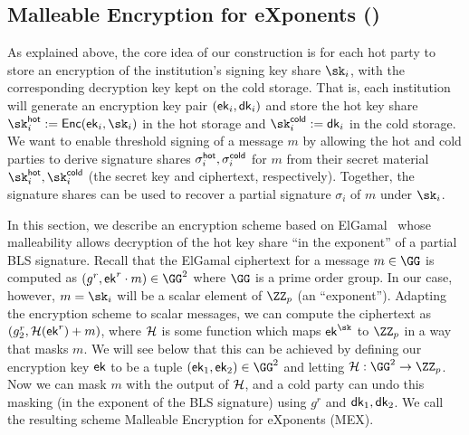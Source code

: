 \subsection{Malleable Encryption for eXponents (\mex)}\label{sec:mex}

As explained above, the core idea of our construction is for each hot party to store an encryption of the institution's signing key share $\sk_i$, with the corresponding decryption key kept on the cold storage.
That is, each institution will generate an encryption key pair $(\mathsf{ek}_i, \mathsf{dk}_i)$ and store the hot key share $\sk_i^\hot := \enc(\ek_i, \sk_i)$ in the hot storage and $\sk_i^\cold := \dk_i$ in the cold storage.
We want to enable threshold signing of a message $m$ by allowing the hot and cold parties to derive signature shares $\sigma_i^{\mathsf{hot}}, \sigma_i^{\mathsf{cold}}$ for $m$ from their secret material $\sk_i^\hot, \sk_i^\cold$ (the secret key and ciphertext, respectively). Together, the signature shares can be used to recover a partial signature $\sigma_i$ of $m$ under $\sk_i$.

In this section, we describe an encryption scheme based on ElGamal~\cite{C:ElGamal84} whose malleability allows decryption of the hot key share ``in the exponent'' of a partial BLS signature.
Recall that the ElGamal ciphertext for a message $m \in \GG$ is computed as $(g^r, \ek^r \cdot m) \in \GG^2$ where $\GG$ is a prime order group. In our case, however, $m = \sk_i$ will be a scalar element of $\ZZ_p$ (an ``exponent'').
Adapting the encryption scheme to scalar messages, we can compute the ciphertext as $(g_2^r, \mathcal{H}(\mathsf{ek}^r) + m)$, where $\mathcal{H}$ is some function which maps $\ek^{\sk}$ to $\ZZ_p$ in a way that masks $m$. 
We will see below that this can be achieved by defining our encryption key $\mathsf{ek}$ to be a tuple $(\ek_1, \ek_2) \in \GG^2$ and letting $\lhlhash: \GG^2 \to \ZZ_p$.
Now we can mask $m$ with the output of $\mathcal{H}$, and a cold party can undo this masking (in the exponent of the BLS signature) using $g^r$ and $\mathsf{dk}_1, \mathsf{dk}_2$.
We call the resulting scheme Malleable Encryption for eXponents (MEX).

